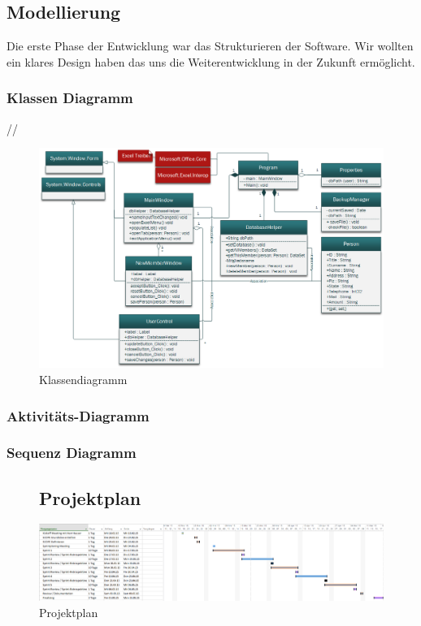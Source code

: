 \documentclass{article}
\begin{document}
\subsection{Modellierung}
Die erste Phase der Entwicklung war das Strukturieren der Software. Wir wollten ein klares Design haben das uns die Weiterentwicklung in der Zukunft ermöglicht. 

\subsubsection{Klassen Diagramm}//
\begin{figure}
	\centering
	\includegraphics[width=1.05 \textwidth]{KlassendiagrammBild}
	\caption{Klassendiagramm}
\end{figure}

\subsubsection{Aktivitäts-Diagramm}

\subsubsection{Sequenz Diagramm}

\newpage

\begin{landscape}


\begin{figure}
	\subsection{Projektplan}
	\bigskip
\begin{center}
		\centering
		\includegraphics[width=1.05 \paperwidth]{PJPlanung}
		\caption{Projektplan}
\end{center}
\end{figure}

\end{landscape}
\newpage
\end{document}
